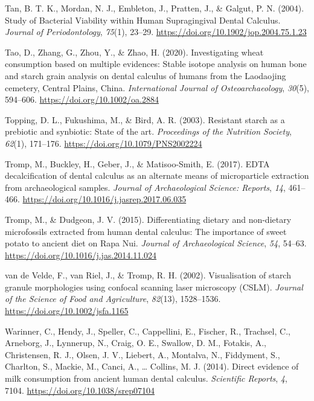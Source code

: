 \documentclass[
  b5paper,
]{book}
\newlength{\cslhangindent}
\newenvironment{CSLReferences}[2] %
 {\begin{list}{}{%
  \setlength{\itemindent}{0pt}
  \setlength{\leftmargin}{0pt}
  \setlength{\parsep}{0pt}
  \ifodd #1
   \setlength{\leftmargin}{\cslhangindent}
   \setlength{\itemindent}{-1\cslhangindent}
  \fi
  \setlength{\itemsep}{#2\baselineskip}}}
 {\end{list}}
\begin{document}
\begin{CSLReferences}{1}{0}
Tan, B. T. K., Mordan, N. J., Embleton, J., Pratten, J., \& Galgut, P.
N. (2004). Study of {Bacterial Viability} within {Human Supragingival
Dental Calculus}. \emph{Journal of Periodontology}, \emph{75}(1),
23--29. \url{https://doi.org/10.1902/jop.2004.75.1.23}

Tao, D., Zhang, G., Zhou, Y., \& Zhao, H. (2020). Investigating wheat
consumption based on multiple evidences: {Stable} isotope analysis on
human bone and starch grain analysis on dental calculus of humans from
the {Laodaojing} cemetery, {Central Plains}, {China}.
\emph{International Journal of Osteoarchaeology}, \emph{30}(5),
594--606. \url{https://doi.org/10.1002/oa.2884}

Topping, D. L., Fukushima, M., \& Bird, A. R. (2003). Resistant starch
as a prebiotic and synbiotic: State of the art. \emph{Proceedings of the
Nutrition Society}, \emph{62}(1), 171--176.
\url{https://doi.org/10.1079/PNS2002224}

Tromp, M., Buckley, H., Geber, J., \& Matisoo-Smith, E. (2017). {EDTA}
decalcification of dental calculus as an alternate means of
microparticle extraction from archaeological samples. \emph{Journal of
Archaeological Science: Reports}, \emph{14}, 461--466.
\url{https://doi.org/10.1016/j.jasrep.2017.06.035}

Tromp, M., \& Dudgeon, J. V. (2015). Differentiating dietary and
non-dietary microfossils extracted from human dental calculus: The
importance of sweet potato to ancient diet on {Rapa Nui}. \emph{Journal
of Archaeological Science}, \emph{54}, 54--63.
\url{https://doi.org/10.1016/j.jas.2014.11.024}

van de Velde, F., van Riel, J., \& Tromp, R. H. (2002). Visualisation of
starch granule morphologies using confocal scanning laser microscopy
({CSLM}). \emph{Journal of the Science of Food and Agriculture},
\emph{82}(13), 1528--1536. \url{https://doi.org/10.1002/jsfa.1165}

Warinner, C., Hendy, J., Speller, C., Cappellini, E., Fischer, R.,
Trachsel, C., Arneborg, J., Lynnerup, N., Craig, O. E., Swallow, D. M.,
Fotakis, A., Christensen, R. J., Olsen, J. V., Liebert, A., Montalva,
N., Fiddyment, S., Charlton, S., Mackie, M., Canci, A., \ldots{}
Collins, M. J. (2014). Direct evidence of milk consumption from ancient
human dental calculus. \emph{Scientific Reports}, \emph{4}, 7104.
\url{https://doi.org/10.1038/srep07104}


\end{CSLReferences}
\end{document}
